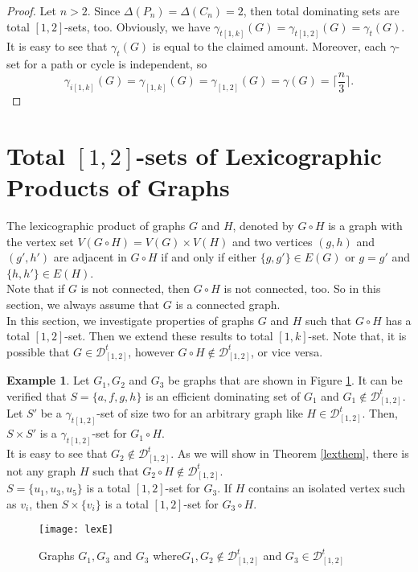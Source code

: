 \documentclass[A4,12pt]{article}
\theoremstyle{definition}
\newtheorem{example}[theorem]{Example}
\theoremstyle{remark}
\begin{document}
	\begin{proof}
		Let  $n > 2$. Since $\Delta(P_n)=\Delta(C_n)=2$, then total dominating sets are total $[1,2]$-sets, too.
		Obviously, we have $\gamma_{t[1,k]}(G)=\gamma_{t[1,2]}(G)=\gamma_{t}(G)$. It is easy to see that   $ \gamma_{t}(G)$ is equal to the claimed amount.
		Moreover, each $\gamma$-set for a path or cycle is independent, so
		$$\gamma_{i[1,k]}(G)=\gamma_{[1,k]}(G)=\gamma_{[1,2]}(G)=\gamma(G)= \lceil \frac{n}{3}\rceil.$$
	\end{proof}
	
	
\section{Total $[1,2]$-sets of Lexicographic Products of Graphs} \label{lexproduct}
The lexicographic product  of graphs $G$ and $H$, denoted by $G\circ H$ is a graph with the vertex set  $V(G \circ H) = V(G) \times V(H)$ and two vertices $(g,h)$ and $(g',h')$ are adjacent in $G \circ H$ if and only if either $\{g,g'\}\in E(G)$ or $g=g'$ and $\{h,h'\} \in E(H)$.
\\
 Note that if $G$ is not connected, then $G \circ H$ is not connected, too. So in this section, we always assume that $G$ is a connected graph.
\\
 In this section, we investigate properties of graphs $G$ and $H$ such that $G \circ H$ has a total $[1,2]$-set. Then we extend these results to total $[1,k]$-set. %
 Note that, it is possible that  $G\in \mathcal{D}^t_{[1,2]}$, however  $G \circ H\notin \mathcal{D}^t_{[1,2]}$, or vice versa.
\begin{example}
 Let $G_1, G_2$ and $G_3$ be graphs that are shown  in Figure \ref{fig:lex}.
 It can be verified that $S=\{a,f,g,h\}$ is an efficient dominating set of $G_1$ and $G_1 \notin \mathcal{D}^t_{[1,2]}$.  Let $S'$ be a $\gamma_{t[1,2]}$-set of size two for an arbitrary  graph like $H \in \mathcal{D}^t_{[1,2]}$. Then, $S\times S'$ is a $\gamma_{t[1,2]}$-set for  $G_1 \circ H$.
 \\
It is easy to see that $G_2 \notin \mathcal{D}^t_{[1,2]}$. As we will show in Theorem \ref{lexthem},  there is not any graph $H$ such that $G_2 \circ H \notin \mathcal{D}^t_{[1,2]}$.
  \\
  $S=\{u_1,u_3,u_5\}$ is a total ${[1,2]}$-set for $G_3$. If $H$ contains an isolated vertex such as $v_i$, then $S\times \{v_i\}$  is a total $[1,2]$-set for $G_3 \circ H$.

 \begin{figure}[h!]
   \centering
     \texttt{[image: lexE]}
      \caption{Graphs $G_1,G_3$ and $G_3$ where$G_1 , G_2 \notin \mathcal{D}^t_{[1,2]}$ and $G_3 \in \mathcal{D}^t_{[1,2]}$}
       \label{fig:lex}
\end{figure}
 \end{example}
\end{document}
